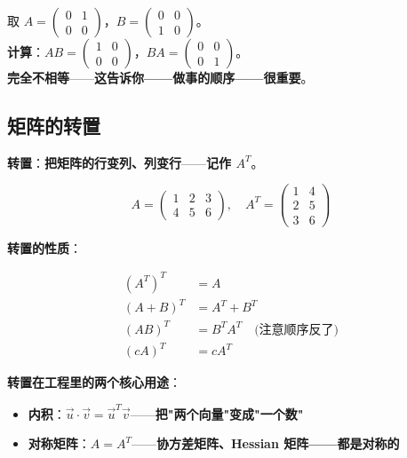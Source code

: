 \begin{example}[$AB \ne BA$ 的反例]
取 $A = \begin{pmatrix}0&1\\0&0\end{pmatrix}$，$B = \begin{pmatrix}0&0\\1&0\end{pmatrix}$。\\
\textbf{计算}：$AB = \begin{pmatrix}1&0\\0&0\end{pmatrix}$，$BA = \begin{pmatrix}0&0\\0&1\end{pmatrix}$。\\
\textbf{完全不相等}——\textbf{这告诉你——做事的顺序——很重要}。
\end{example}

\subsection{矩阵的转置}

\textbf{转置}：\textbf{把矩阵的行变列、列变行}——\textbf{记作 $A^T$}。

\[
A = \begin{pmatrix} 1 & 2 & 3 \\ 4 & 5 & 6 \end{pmatrix}, \quad
A^T = \begin{pmatrix} 1 & 4 \\ 2 & 5 \\ 3 & 6 \end{pmatrix}
\]

\textbf{转置的性质}：

\begin{align}
(A^T)^T &= A \\
(A+B)^T &= A^T + B^T \\
(AB)^T &= B^T A^T \quad \text{(注意顺序反了)}\\
(cA)^T &= c A^T
\end{align}

\textbf{转置在工程里的两个核心用途}：

\begin{itemize}
\item \textbf{内积}：$\vec{u} \cdot \vec{v} = \vec{u}^T \vec{v}$——\textbf{把"两个向量"变成"一个数"}
\item \textbf{对称矩阵}：$A = A^T$——\textbf{协方差矩阵、Hessian 矩阵——都是对称的}
\end{itemize}

